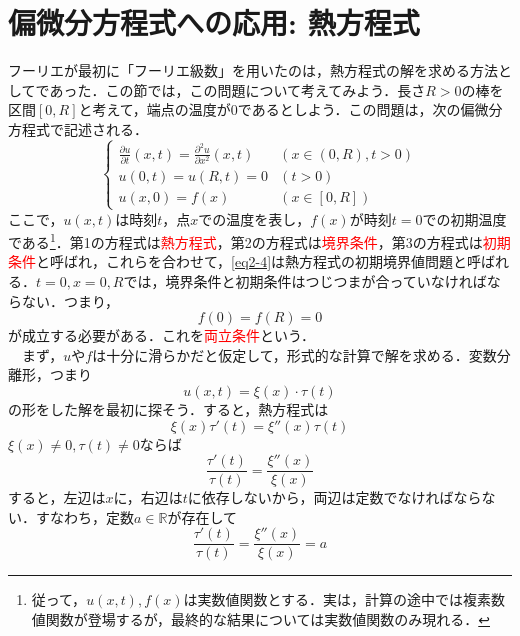 \documentclass[a4j]{jsbook}
\numberwithin{theorem}{chapter}  %
\begin{document}
\section{偏微分方程式への応用: 熱方程式} \label{sec2-2}
フーリエが最初に「フーリエ級数」を用いたのは，熱方程式の解を求める方法としてであった．この節では，この問題について考えてみよう．長さ\(R>0\)の棒を区間\([0, R]\)と考えて，端点の温度が0であるとしよう．この問題は，次の偏微分方程式で記述される．
\begin{equation}
    \label{eq2-4}
    \begin{cases}
    \frac{\partial u}{\partial t}(x, t)=\frac{\partial^2 u}{\partial x^2}(x, t) & (x\in(0, R), t>0) \\
    u(0, t)=u(R,t)=0 & (t>0) \\
    u(x, 0)=f(x) & (x\in[0, R])
    \end{cases}
\end{equation}
ここで，\(u(x, t)\)は時刻\(t\)，点\(x\)での温度を表し，\(f(x)\)が時刻\(t=0\)での初期温度である\footnote{従って，\(u(x, t), f(x)\)は実数値関数とする．実は，計算の途中では複素数値関数が登場するが，最終的な結果については実数値関数のみ現れる．}．第1の方程式は\textcolor{red}{熱方程式}，第2の方程式は\textcolor{red}{境界条件}，第3の方程式は\textcolor{red}{初期条件}と呼ばれ，これらを合わせて，\eqref{eq2-4}は熱方程式の初期境界値問題と呼ばれる．\(t=0, x=0, R\)では，境界条件と初期条件はつじつまが合っていなければならない．つまり，
\begin{equation}
    \label{eq2-5}
    f(0)=f(R)=0
\end{equation}
が成立する必要がある．これを\textcolor{red}{両立条件}という．\\
　まず，\(u\)や\(f\)は十分に滑らかだと仮定して，形式的な計算で解を求める．変数分離形，つまり
\begin{equation*}
    u(x, t)=\xi(x)\cdot\tau(t)
\end{equation*}
の形をした解を最初に探そう．すると，熱方程式は
\begin{equation*}
    \xi(x)\tau'(t)=\xi''(x)\tau(t)
\end{equation*}
\(\xi(x)\neq 0, \tau(t)\neq 0\)ならば
\begin{equation*}
    \frac{\tau'(t)}{\tau(t)}=\frac{\xi''(x)}{\xi(x)}
\end{equation*}
すると，左辺は\(x\)に，右辺は\(t\)に依存しないから，両辺は定数でなければならない．すなわち，定数\(a\in\mathbb{R}\)が存在して
\begin{equation*}
    \frac{\tau'(t)}{\tau(t)}=\frac{\xi''(x)}{\xi(x)}=a
\end{equation*}
\end{document}
